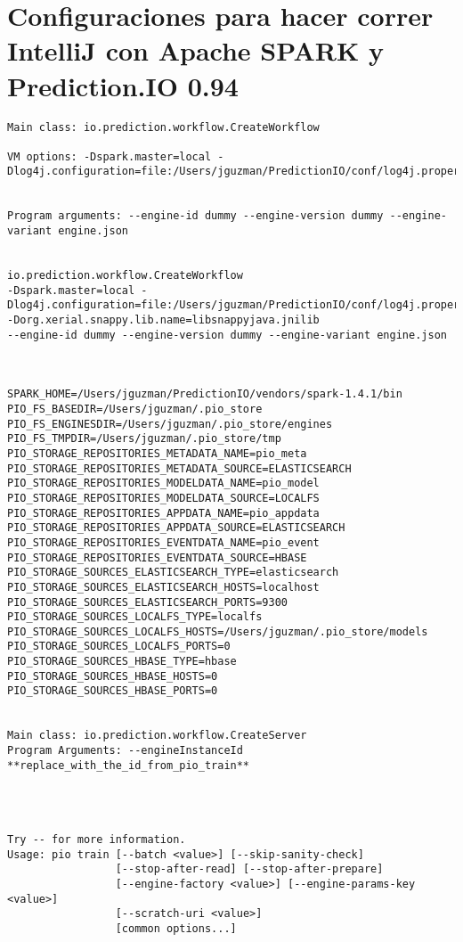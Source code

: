 \newpage
\section{Configuraciones para hacer correr IntelliJ con Apache SPARK y Prediction.IO 0.94}

\begin{lstlisting}[frame=single,basicstyle=\ttfamily\tiny,]
Main class: io.prediction.workflow.CreateWorkflow

VM options: -Dspark.master=local -Dlog4j.configuration=file:/Users/jguzman/PredictionIO/conf/log4j.properties


Program arguments: --engine-id dummy --engine-version dummy --engine-variant engine.json


io.prediction.workflow.CreateWorkflow
-Dspark.master=local -Dlog4j.configuration=file:/Users/jguzman/PredictionIO/conf/log4j.properties -Dorg.xerial.snappy.lib.name=libsnappyjava.jnilib 
--engine-id dummy --engine-version dummy --engine-variant engine.json



SPARK_HOME=/Users/jguzman/PredictionIO/vendors/spark-1.4.1/bin
PIO_FS_BASEDIR=/Users/jguzman/.pio_store
PIO_FS_ENGINESDIR=/Users/jguzman/.pio_store/engines
PIO_FS_TMPDIR=/Users/jguzman/.pio_store/tmp
PIO_STORAGE_REPOSITORIES_METADATA_NAME=pio_meta
PIO_STORAGE_REPOSITORIES_METADATA_SOURCE=ELASTICSEARCH
PIO_STORAGE_REPOSITORIES_MODELDATA_NAME=pio_model
PIO_STORAGE_REPOSITORIES_MODELDATA_SOURCE=LOCALFS
PIO_STORAGE_REPOSITORIES_APPDATA_NAME=pio_appdata
PIO_STORAGE_REPOSITORIES_APPDATA_SOURCE=ELASTICSEARCH
PIO_STORAGE_REPOSITORIES_EVENTDATA_NAME=pio_event
PIO_STORAGE_REPOSITORIES_EVENTDATA_SOURCE=HBASE
PIO_STORAGE_SOURCES_ELASTICSEARCH_TYPE=elasticsearch
PIO_STORAGE_SOURCES_ELASTICSEARCH_HOSTS=localhost
PIO_STORAGE_SOURCES_ELASTICSEARCH_PORTS=9300
PIO_STORAGE_SOURCES_LOCALFS_TYPE=localfs
PIO_STORAGE_SOURCES_LOCALFS_HOSTS=/Users/jguzman/.pio_store/models
PIO_STORAGE_SOURCES_LOCALFS_PORTS=0
PIO_STORAGE_SOURCES_HBASE_TYPE=hbase
PIO_STORAGE_SOURCES_HBASE_HOSTS=0
PIO_STORAGE_SOURCES_HBASE_PORTS=0


Main class: io.prediction.workflow.CreateServer
Program Arguments: --engineInstanceId **replace_with_the_id_from_pio_train**




Try -- for more information.
Usage: pio train [--batch <value>] [--skip-sanity-check]
                 [--stop-after-read] [--stop-after-prepare]
                 [--engine-factory <value>] [--engine-params-key <value>]
                 [--scratch-uri <value>]
                 [common options...]


\end{lstlisting}
